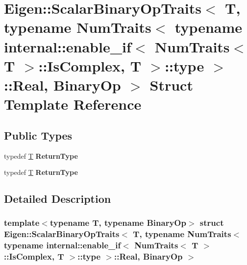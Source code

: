 \hypertarget{struct_eigen_1_1_scalar_binary_op_traits_3_01_t_00_01typename_01_num_traits_3_01typename_01inter6d9b2ba43c8f599c26e1e5ea9727da7f}{}\section{Eigen\+:\+:Scalar\+Binary\+Op\+Traits$<$ T, typename Num\+Traits$<$ typename internal\+:\+:enable\+\_\+if$<$ Num\+Traits$<$ T $>$\+:\+:Is\+Complex, T $>$\+:\+:type $>$\+:\+:Real, Binary\+Op $>$ Struct Template Reference}
\label{struct_eigen_1_1_scalar_binary_op_traits_3_01_t_00_01typename_01_num_traits_3_01typename_01inter6d9b2ba43c8f599c26e1e5ea9727da7f}
\subsection*{Public Types}
\begin{DoxyCompactItemize}
\item 
\mbox{\label{struct_eigen_1_1_scalar_binary_op_traits_3_01_t_00_01typename_01_num_traits_3_01typename_01inter6d9b2ba43c8f599c26e1e5ea9727da7f_ac255ba4c0d28dd1d600d3220dc31d078}} 
typedef \hyperlink{group___sparse_core___module}{T} {\bfseries Return\+Type}
\item 
\mbox{\label{struct_eigen_1_1_scalar_binary_op_traits_3_01_t_00_01typename_01_num_traits_3_01typename_01inter6d9b2ba43c8f599c26e1e5ea9727da7f_ac255ba4c0d28dd1d600d3220dc31d078}} 
typedef \hyperlink{group___sparse_core___module}{T} {\bfseries Return\+Type}
\end{DoxyCompactItemize}


\subsection{Detailed Description}
\subsubsection*{template$<$typename T, typename Binary\+Op$>$\newline
struct Eigen\+::\+Scalar\+Binary\+Op\+Traits$<$ T, typename Num\+Traits$<$ typename internal\+::enable\+\_\+if$<$ Num\+Traits$<$ T $>$\+::\+Is\+Complex, T $>$\+::type $>$\+::\+Real, Binary\+Op $>$}



